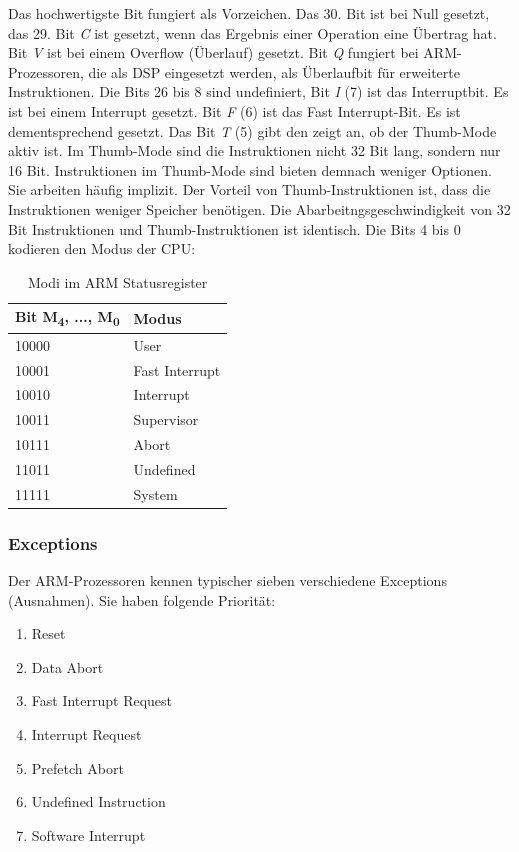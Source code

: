 Das hochwertigste Bit fungiert als Vorzeichen. Das 30. Bit ist bei Null gesetzt, das 29. Bit \textit{C} ist gesetzt, wenn das Ergebnis einer Operation eine Übertrag hat. Bit \textit{V} ist bei einem Overflow (Überlauf) gesetzt. Bit \textit{Q} fungiert bei ARM-Prozessoren, die als \ac{DSP} eingesetzt werden, als Überlaufbit für erweiterte Instruktionen. Die Bits 26 bis 8 sind undefiniert, Bit \textit{I} (7) ist das Interruptbit. Es ist bei einem Interrupt gesetzt. Bit \textit{F} (6) ist das Fast Interrupt-Bit. Es ist dementsprechend gesetzt. Das Bit \textit{T} (5) gibt den zeigt an, ob der Thumb-Mode aktiv ist. Im Thumb-Mode sind die Instruktionen nicht 32 Bit lang, sondern nur 16 Bit. Instruktionen im Thumb-Mode sind bieten demnach weniger Optionen. Sie arbeiten häufig implizit. Der Vorteil von Thumb-Instruktionen ist, dass die Instruktionen weniger Speicher benötigen. Die Abarbeitngsgeschwindigkeit von 32 Bit Instruktionen und Thumb-Instruktionen ist identisch. Die Bits 4 bis 0 kodieren den Modus der CPU:
\begin{table}
    \begin{tabular}{l|l}
    Bit M\textsubscript{4}, ..., M\textsubscript{0}  & Modus          \\ \hline
    10000 & User           \\
    10001 & Fast Interrupt \\
    10010 & Interrupt      \\
    10011 & Supervisor     \\
    10111 & Abort          \\
    11011 & Undefined      \\
    11111 & System         \\
    \end{tabular}
    \caption {Modi im ARM Statusregister}
\end{table}
\cite{arm2009}

\subsubsection{Exceptions}
Der ARM-Prozessoren kennen typischer sieben verschiedene Exceptions (Ausnahmen). Sie haben folgende Priorität:
\begin{enumerate}
\item Reset
\item Data Abort
\item Fast Interrupt Request
\item Interrupt Request
\item Prefetch Abort
\item Undefined Instruction
\setcounter{enumi}{5} %
\item Software Interrupt
\end{enumerate}

